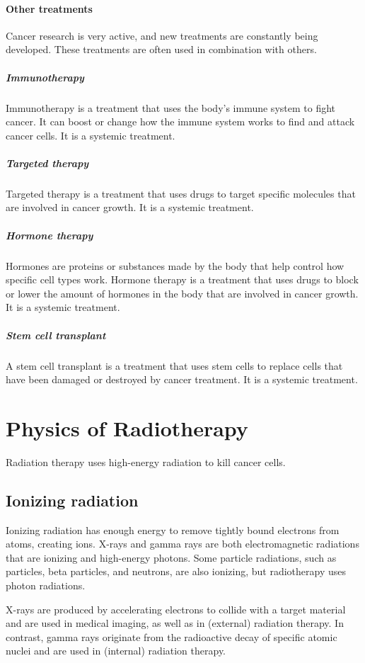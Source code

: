 \paragraph{Other treatments}
Cancer research is very active, and new treatments are constantly being developed.
These treatments are often used in combination with others.

\subparagraph{Immunotherapy}
Immunotherapy is a treatment that uses the body's immune system to fight cancer.
It can boost or change how the immune system works to find and attack cancer cells.
It is a systemic treatment.

\subparagraph{Targeted therapy}
Targeted therapy is a treatment that uses drugs to target specific molecules that are involved in cancer growth.
It is a systemic treatment.

\subparagraph{Hormone therapy}
Hormones are proteins or substances made by the body that help control how specific cell types work.
Hormone therapy is a treatment that uses drugs to block or lower the amount of hormones in the body that are involved in cancer growth.
It is a systemic treatment.

\subparagraph{Stem cell transplant}
A stem cell transplant is a treatment that uses stem cells to replace cells that have been damaged or destroyed by cancer treatment.
It is a systemic treatment.

\section{Physics of Radiotherapy}

Radiation therapy uses high-energy radiation to kill cancer cells.

\subsection{Ionizing radiation}
Ionizing radiation has enough energy to remove tightly bound electrons from atoms, creating ions.
X-rays and gamma rays are both electromagnetic radiations that are ionizing and high-energy photons.
Some particle radiations, such as particles, beta particles, and neutrons, are also ionizing, but radiotherapy uses photon radiations.

X-rays are produced by accelerating electrons to collide with a target material and are used in medical imaging, as well as in (external) radiation therapy.
In contrast, gamma rays originate from the radioactive decay of specific atomic nuclei and are used in (internal) radiation therapy. 

